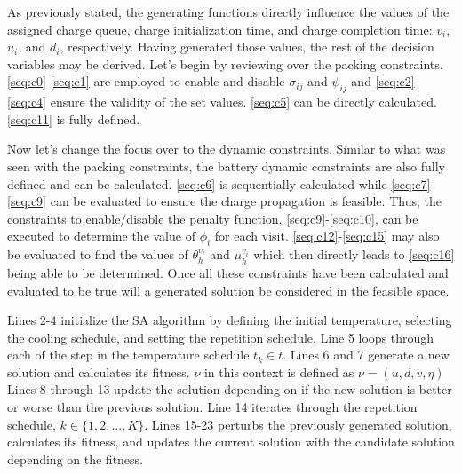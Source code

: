 \documentclass[11pt,a4paper,final]{article}
\begin{document}
As previously stated, the generating functions directly influence the values of the assigned charge queue, charge
initialization time, and charge completion time: \(v_i\), \(u_i\), and \(d_i\), respectively. Having generated those values,
the rest of the decision variables may be derived. Let's begin by reviewing over the packing constraints.
\ref{seq:c0}-\ref{seq:c1} are employed to enable and disable \(\sigma_{ij}\) and \(\psi_{ij}\) and \ref{seq:c2}-\ref{seq:c4} ensure
the validity of the set values. \ref{seq:c5} can be directly calculated. \ref{seq:c11} is fully defined.

Now let's change the focus over to the dynamic constraints. Similar to what was seen with the packing constraints, the
battery dynamic constraints are also fully defined and can be calculated. \ref{seq:c6} is sequentially calculated while
\ref{seq:c7}-\ref{seq:c9} can be evaluated to ensure the charge propagation is feasible. Thus, the constraints to
enable/disable the penalty function, \ref{seq:c9}-\ref{seq:c10}, can be executed to determine the value of \(\phi_i\) for
each visit. \ref{seq:c12}-\ref{seq:c15} may also be evaluated to find the values of \(\theta_h^{v_i}\) and \(\mu_h^{v_i}\) which
then directly leads to \ref{seq:c16} being able to be determined. Once all these constraints have been calculated and
evaluated to be true will a generated solution be considered in the feasible space.

Lines 2-4 initialize the SA algorithm by defining the initial temperature, selecting the cooling schedule, and setting
the repetition schedule. Line 5 loops through each of the step in the temperature schedule \(t_k \in t\). Lines 6 and 7
generate a new solution and calculates its fitness. \(\nu\) in this context is defined as \(\nu = (u, d, v, \eta)\) Lines 8 through
13 update the solution depending on if the new solution is better or worse than the previous solution. Line 14 iterates
through the repetition schedule, \(k \in \{1, 2, ..., K\}\). Lines 15-23 perturbs the previously generated solution,
calculates its fitness, and updates the current solution with the candidate solution depending on the fitness.
\end{document}
